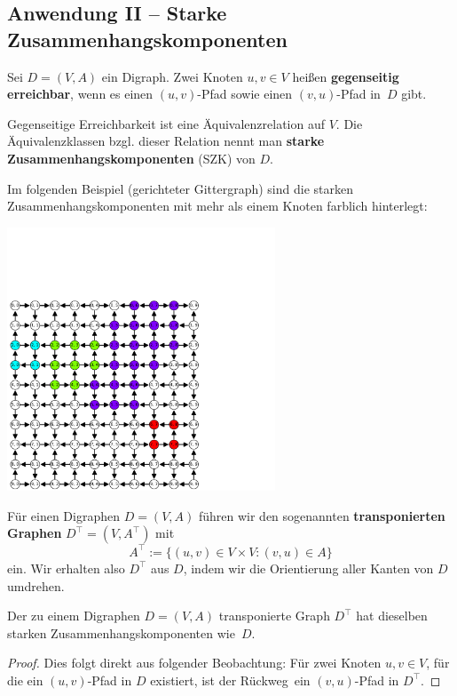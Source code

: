\subsection{Anwendung II -- Starke Zusammenhangskomponenten}

\begin{defn}
Sei $D=(V,A)$ ein Digraph. Zwei	Knoten $u,v \in V$ heißen \textbf{gegenseitig erreichbar}, wenn es einen $(u,v)$-Pfad sowie einen $(v,u)$-Pfad in~$D$ gibt. 

Gegenseitige Erreichbarkeit ist eine Äquivalenzrelation auf $V$. Die Äquivalenzklassen bzgl. dieser Relation nennt man \textbf{starke Zusammenhangskomponenten} (SZK) von $D$. 
\end{defn} 

\begin{bsp}
Im folgenden Beispiel (gerichteter Gittergraph) sind die starken Zusammenhangskomponenten mit mehr als einem Knoten farblich hinterlegt:

\hfill
	\includegraphics[width=0.6\textwidth]{Code/strongly_connected_comp.pdf}
\hfill\,
\end{bsp}


\begin{defn}
	Für einen Digraphen $D = (V,A)$ führen wir den sogenannten
 \textbf{transponierten Graphen} $D^\top = (V,A^\top)$ mit
 \[
 A^\top := \{(u,v) \in V \times V : (v,u) \in A\}
 \]
 ein. 
Wir erhalten also $D^\top$ aus $D$, indem wir die Orientierung aller Kanten von $D$ umdrehen.
\end{defn} 


\begin{prop}
\label{beob:d-vs-dt}
Der zu einem Digraphen $D=(V,A)$ transponierte Graph $D^\top$ hat dieselben starken Zusammenhangskomponenten wie~$D$.
\end{prop}
\begin{proof}
Dies folgt direkt aus folgender Beobachtung: Für zwei Knoten $u,v \in V$, für die ein $(u,v)$-Pfad in $D$ existiert, ist der \glqq Rückweg\grqq\ ein $(v,u)$-Pfad in $D^\top$.
\end{proof}

